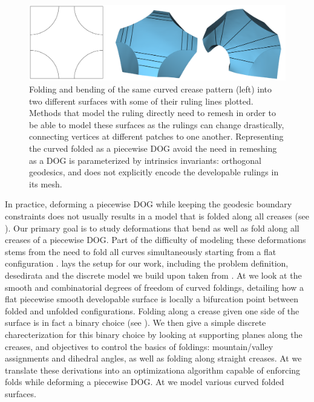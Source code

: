 \begin{figure} [h]
	\centering
	\includegraphics[width=\linewidth]{figures/rulings_problem_curve}
	\caption{Folding and bending of the same curved crease pattern (left) into two different surfaces with some of their ruling lines plotted. Methods that model the ruling directly need to remesh in order to be able to model these surfaces as the rulings can change drastically, connecting vertices at different patches to one another. Representing the curved folded as a piecewise DOG avoid the need in remeshing as a DOG is parameterized by intrinsics invariants: orthogonal geodesics, and does not explicitly encode the developable rulings in its mesh. }
	\label{fig:rulings_problem_curve}
\end{figure}

In practice, deforming a piecewise DOG while keeping the geodesic boundary constraints does not usually results in a model that is folded along all creases (see ). Our primary goal is to study deformations that bend as well as fold along all creases of a piecewise DOG. Part of the difficulty of modeling these deformations stems from the need to fold all curves simultaneously starting from a flat configuration \cite{more_on_paper}.  lays the setup for our work, including the problem definition, desedirata and the discrete model we build upon taken from \cite{rabi18,rabi2018shape}. At  we look at the smooth and combinatorial degrees of freedom of curved foldings, detailing how a flat piecewise smooth developable surface is locally a bifurcation point between folded and unfolded configurations. Folding along a crease given one side of the surface is in fact a binary choice (see ). We then give a simple discrete charecterization for this binary choice by looking at supporting planes along the creases, and objectives to control the basics of foldings: mountain/valley assignments and dihedral angles, as well as folding along straight creases. At  we translate these derivations into an optimizationa algorithm capable of enforcing folds while deforming a piecewise DOG. At  we model various curved folded surfaces.


